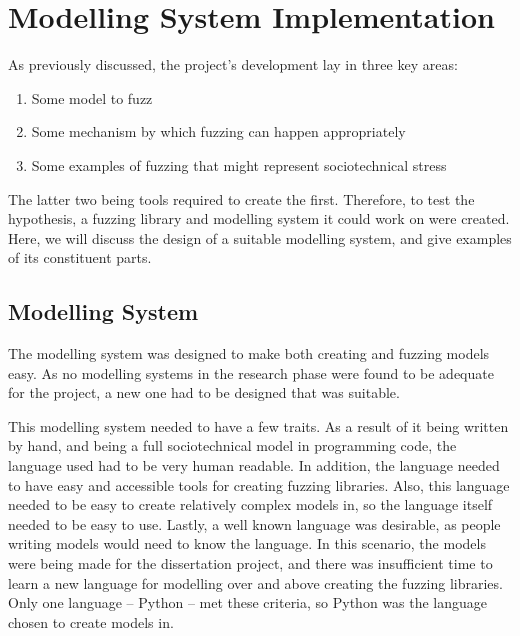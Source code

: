 \chapter{Modelling System Implementation}
\label{modelling_implementation_head}
As previously discussed, the project's development lay in three key areas: 
\begin{enumerate}
    \item Some model to fuzz
    \item Some mechanism by which fuzzing can happen appropriately
    \item Some examples of fuzzing that might represent sociotechnical stress
\end{enumerate}\par

The latter two being tools required to create the first. Therefore, to test the hypothesis, a fuzzing library and modelling system it could work on were created. Here, we will discuss the design of a suitable modelling system, and give examples of its constituent parts. 

\section{Modelling System}
\label{model_outline}
The modelling system was designed to make both creating and fuzzing models easy. As no modelling systems in the research phase were found to be adequate for the project, a new one had to be designed that was suitable. \par

This modelling system needed to have a few traits. As a result of it being written by hand, and being a full sociotechnical model in programming code, the language used had to be very human readable. In addition, the language needed to have easy and accessible tools for creating fuzzing libraries. Also, this language needed to be easy to create relatively complex models in, so the language itself needed to be easy to use. Lastly, a well known language was desirable, as people writing models would need to know the language. In this scenario, the models were being made for the dissertation project, and there was insufficient time to learn a new language for modelling over and above creating the fuzzing libraries. Only one language -- Python -- met these criteria, so Python was the language chosen to create models in. \par%

